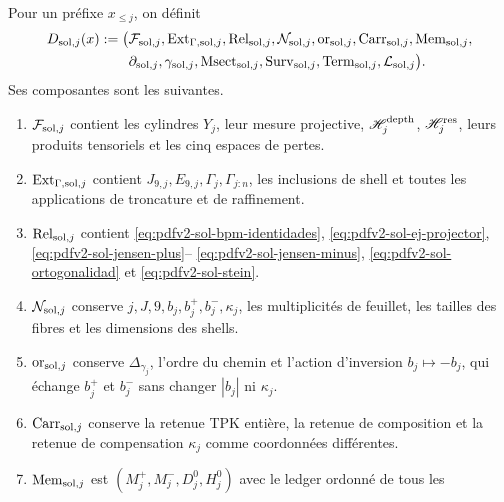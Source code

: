 Pour un préfixe \(x_{\leq j}\), on définit
\begin{equation}\label{eq:pdfv2-sol-d-package}
 \begin{aligned}
 D_{{\rm sol},j}(x):=\bigl(&
 \mathcal F_{{\rm sol},j},
 \operatorname{Ext}_{\Gamma,{\rm sol},j},
 \operatorname{Rel}_{{\rm sol},j},
 \mathcal N_{{\rm sol},j},
 \operatorname{or}_{{\rm sol},j},
 \operatorname{Carr}_{{\rm sol},j},
 \operatorname{Mem}_{{\rm sol},j},\\
 &\partial_{{\rm sol},j},
 \gamma_{{\rm sol},j},
 \operatorname{Msect}_{{\rm sol},j},
 \operatorname{Surv}_{{\rm sol},j},
 \operatorname{Term}_{{\rm sol},j},
 \mathcal L_{{\rm sol},j}\bigr).
 \end{aligned}
\end{equation}
Ses composantes sont les suivantes.
\begin{enumerate}
 \item \(\mathcal F_{{\rm sol},j}\) contient les cylindres \(Y_j\), leur mesure
       projective, \(\mathscr H_j^{\rm depth}\),
       \(\mathscr H_j^{\rm res}\), leurs produits tensoriels et les cinq
       espaces de pertes.
 \item \(\operatorname{Ext}_{\Gamma,{\rm sol},j}\) contient
       \(J_{9,j},E_{9,j},\Gamma_j,\Gamma_{j:n}\), les inclusions de shell et
       toutes les applications de troncature et de raffinement.
 \item \(\operatorname{Rel}_{{\rm sol},j}\) contient
       \eqref{eq:pdfv2-sol-bpm-identidades},
       \eqref{eq:pdfv2-sol-ej-projector},
       \eqref{eq:pdfv2-sol-jensen-plus}--
       \eqref{eq:pdfv2-sol-jensen-minus},
       \eqref{eq:pdfv2-sol-ortogonalidad} et
       \eqref{eq:pdfv2-sol-stein}.
 \item \(\mathcal N_{{\rm sol},j}\) conserve
       \(j,J,9,b_j,b_j^+,b_j^-,\kappa_j\), les multiplicités de feuillet, les tailles
       des fibres et les dimensions des shells.
 \item \(\operatorname{or}_{{\rm sol},j}\) conserve
       \(\Delta_{\gamma_j}\), l'ordre du chemin et l'action d'inversion
       \(b_j\mapsto-b_j\), qui échange \(b_j^+\) et \(b_j^-\) sans changer
       \(|b_j|\) ni \(\kappa_j\).
 \item \(\operatorname{Carr}_{{\rm sol},j}\) conserve la retenue TPK entière,
       la retenue de composition et la retenue de compensation \(\kappa_j\) comme
       coordonnées différentes.
 \item \(\operatorname{Mem}_{{\rm sol},j}\) est
       \((M_j^+,M_j^-,D_j^0,H_j^0)\) avec le ledger ordonné de tous les

\end{enumerate}
